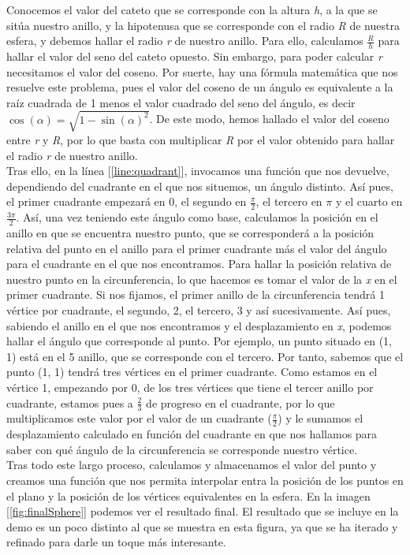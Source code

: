 Conocemos el valor del cateto que se corresponde con la altura \emph{h}, a la que se sitúa nuestro anillo, y la hipotenusa que se corresponde con el radio \emph{R} de nuestra esfera, y debemos hallar el radio \emph{r} de nuestro anillo. Para ello, calculamos \(\frac{R}{h}\) para hallar el valor del seno del cateto opuesto. Sin embargo, para poder calcular \emph{r} necesitamos el valor del coseno. Por suerte, hay una fórmula matemática que nos resuelve este problema, pues el valor del coseno de un ángulo es equivalente a la raíz cuadrada de 1 menos el valor cuadrado del seno del ángulo, es decir \(\cos(\alpha) = \sqrt{1 - \sin(\alpha)^2}\). De este modo, hemos hallado el valor del coseno entre \emph{r} y \emph{R}, por lo que basta con multiplicar \emph{R} por el valor obtenido para hallar el radio \emph{r} de nuestro anillo.\\

Tras ello, en la línea [\ref{line:quadrant}], invocamos una función que nos devuelve, dependiendo del cuadrante en el que nos situemos, un ángulo distinto. Así pues, el primer cuadrante empezará en 0, el segundo en \(\frac{\pi}{2}\), el tercero en \(\pi\) y el cuarto en \(\frac{3\pi}{2}\). Así, una vez teniendo este ángulo como base, calculamos la posición en el anillo en que se encuentra nuestro punto, que se corresponderá a la posición relativa del punto en el anillo para el primer cuadrante más el valor del ángulo para el cuadrante en el que nos encontramos. Para hallar la posición relativa de nuestro punto en la circunferencia, lo que hacemos es tomar el valor de la \emph{x} en el primer cuadrante. Si nos fijamos, el primer anillo de la circunferencia tendrá 1 vértice por cuadrante, el segundo, 2, el tercero, 3 y así sucesivamente. Así pues, sabiendo el anillo en el que nos encontramos y el desplazamiento en \emph{x}, podemos hallar el ángulo que corresponde al punto. Por ejemplo, un punto situado en (1, 1) está en el 5 anillo, que se corresponde con el tercero. Por tanto, sabemos que el punto (1, 1) tendrá tres vértices en el primer cuadrante. Como estamos en el vértice 1, empezando por 0, de los tres vértices que tiene el tercer anillo por cuadrante, estamos pues a \(\frac{2}{3}\) de progreso en el cuadrante, por lo que multiplicamos este valor por el valor de un cuadrante (\(\frac{\pi}{2}\)) y le sumamos el desplazamiento calculado en función del cuadrante en que nos hallamos para saber con qué ángulo de la circunferencia se corresponde nuestro vértice.\\

Tras todo este largo proceso, calculamos y almacenamos el valor del punto y creamos una función que nos permita interpolar entra la posición de los puntos en el plano y la posición de los vértices equivalentes en la esfera. En la imagen [\ref{fig:finalSphere}] podemos ver el resultado final. El resultado que se incluye en la demo es un poco distinto al que se muestra en esta figura, ya que se ha iterado y refinado para darle un toque más interesante.\\


